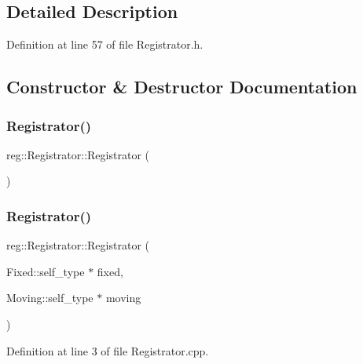 \subsection{Detailed Description}


Definition at line 57 of file Registrator.\+h.



\subsection{Constructor \& Destructor Documentation}
\mbox{\label{structreg_1_1_registrator_a0a8d44017cb8112001a1d13f984145ef}} 
\subsubsection{\texorpdfstring{Registrator()}{Registrator()}\hspace{0.1cm}{\footnotesize\ttfamily [1/2]}}
{\footnotesize\ttfamily reg\+::\+Registrator\+::\+Registrator (\begin{DoxyParamCaption}{ }\end{DoxyParamCaption})\hspace{0.3cm}{\ttfamily [default]}}

\mbox{\label{structreg_1_1_registrator_a63b1984827ba8ccbbc785502bbc3c5da}} 
\subsubsection{\texorpdfstring{Registrator()}{Registrator()}\hspace{0.1cm}{\footnotesize\ttfamily [2/2]}}
{\footnotesize\ttfamily reg\+::\+Registrator\+::\+Registrator (\begin{DoxyParamCaption}\item[{Fixed\+::self\+\_\+type $\ast$}]{fixed,  }\item[{Moving\+::self\+\_\+type $\ast$}]{moving }\end{DoxyParamCaption})}



Definition at line 3 of file Registrator.\+cpp.



